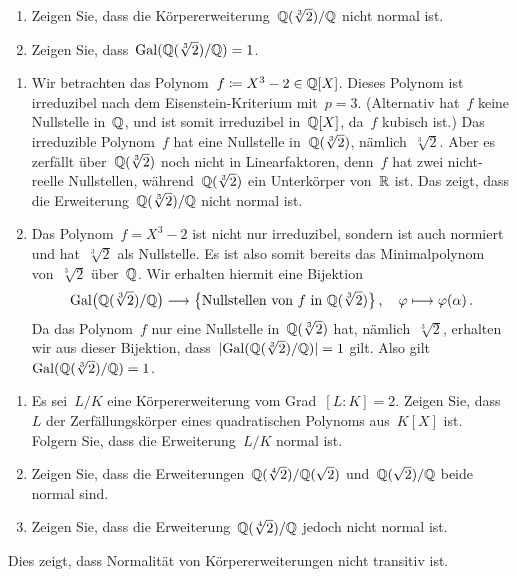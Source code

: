 \documentclass{scrartcl}
\begin{document}
\begin{exercise}[subtitle = {Erstklausur~18/19}]
  \begin{enumerate}
    \item
      Zeigen Sie, dass die Körpererweiterung~$\mathbb{Q}(\sqrt[3]{2}) / \mathbb{Q}$ nicht normal ist.
    \item
      Zeigen Sie, dass~$\operatorname{Gal}( \mathbb{Q}(\sqrt[3]{2}) / \mathbb{Q} ) = 1$.
  \end{enumerate}
\end{exercise}

\begin{solution}
  \begin{enumerate}
    \item
      Wir betrachten das Polynom~$f \coloneqq X^3 - 2 \in \mathbb{Q}[X]$.
      Dieses Polynom ist irreduzibel nach dem Eisenstein-Kriterium mit~$p = 3$.
      (Alternativ hat~$f$ keine Nullstelle in~$\mathbb{Q}$, und ist somit irreduzibel in~$\mathbb{Q}[X]$, da~$f$ kubisch ist.)
      Das irreduzible Polynom~$f$ hat eine Nullstelle in~$\mathbb{Q}(\sqrt[3]{2})$, nämlich~$\sqrt[3]{2}$.
      Aber es zerfällt über~$\mathbb{Q}(\sqrt[3]{2})$ noch nicht in Linearfaktoren, denn~$f$ hat zwei nicht-reelle Nullstellen, während~$\mathbb{Q}(\sqrt[3]{2})$ ein Unterkörper von~$\mathbb{R}$ ist.
      Das zeigt, dass die Erweiterung~$\mathbb{Q}(\sqrt[3]{2}) / \mathbb{Q}$ nicht normal ist.
    \item
      Das Polynom~$f = X^3 - 2$ ist nicht nur irreduzibel, sondern ist auch normiert und hat~$\sqrt[3]{2}$ als Nullstelle.
      Es ist also somit bereits das Minimalpolynom von~$\sqrt[3]{2}$ über~$\mathbb{Q}$.
      Wir erhalten hiermit eine Bijektion
      \[
        \Gal\bigl( \Rational(\sqrt[3]{2}) / \Rational \bigr)
        \to
        \bigl\{
          \text{Nullstellen von~$f$ in~$\Rational( \sqrt[3]{2} )$}
        \bigr\} \,,
        \quad
        \varphi
        \mapsto
        \varphi(\alpha) \,.
      \]
      Da das Polynom~$f$ nur eine Nullstelle in~$\mathbb{Q}(\sqrt[3]{2})$ hat, nämlich~$\sqrt[3]{2}$, erhalten wir aus dieser Bijektion, dass~$\lvert \operatorname{Gal}( \mathbb{Q}(\sqrt[3]{2}) / \mathbb{Q} ) \rvert = 1$ gilt.
      Also gilt~$\operatorname{Gal}( \mathbb{Q}( \sqrt[3]{2} ) / \mathbb{Q} ) = 1$.
  \end{enumerate}
\end{solution}

\begin{exercise}
  \begin{enumerate}
    \item
      Es sei~$L/K$ eine Körpererweiterung vom Grad~$[L : K] = 2$.
      Zeigen Sie, dass~$L$ der Zerfällungskörper eines quadratischen Polynoms aus~$K[X]$ ist.
      Folgern Sie, dass die Erweiterung~$L/K$ normal ist.
    \item
      Zeigen Sie, dass die Erweiterungen~$\mathbb{Q}(\sqrt[4]{2}) / \mathbb{Q}(\sqrt{2})$ und~$\mathbb{Q}(\sqrt{2}) / \mathbb{Q}$ beide normal sind.
    \item
      Zeigen Sie, dass die Erweiterung~$\mathbb{Q}(\sqrt[4]{2}) / \mathbb{Q}$ jedoch nicht normal ist.
  \end{enumerate}
  Dies zeigt, dass Normalität von Körpererweiterungen nicht transitiv ist.
\end{exercise}
\end{document}
